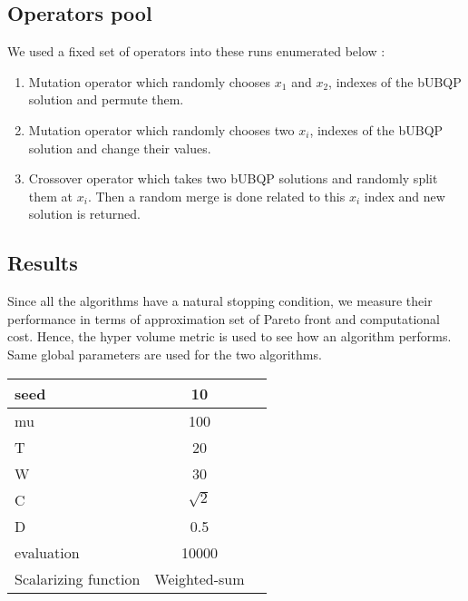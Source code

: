 \documentclass{article}
\begin{document}
    \subsection{Operators pool}

    We used a fixed set of operators into these runs enumerated below :
    \begin{enumerate}
        \item Mutation operator which randomly chooses $x_1$ and $x_2$, indexes of the bUBQP solution and permute them.
        \item Mutation operator which randomly chooses two $x_i$, indexes of the bUBQP solution and change their values.
        \item Crossover operator which takes two bUBQP solutions and randomly split them at $x_i$. Then a random merge is done related to this $x_i$ index and new solution is returned.
    \end{enumerate}

    \subsection{Results}

    Since all the algorithms have a natural stopping condition, we measure their performance in terms of approximation set of Pareto front and computational cost. Hence, the hyper volume metric is used to see how an algorithm performs. Same global parameters are used for the two algorithms.


    \begin{table}[h!]
        \centering
        \begin{tabular}{|l|c|r|}
            \hline
            seed & 10 \\
            \hline
            mu & 100 \\
            \hline
            T & 20 \\
            \hline
            W & 30 \\
            \hline
            C & $\sqrt{2}$ \\
            \hline
            D & 0.5 \\
            \hline
            evaluation & 10000 \\
            \hline
            Scalarizing function & Weighted-sum \\
            \hline
        \end{tabular}
    \end{table}
\end{document}

